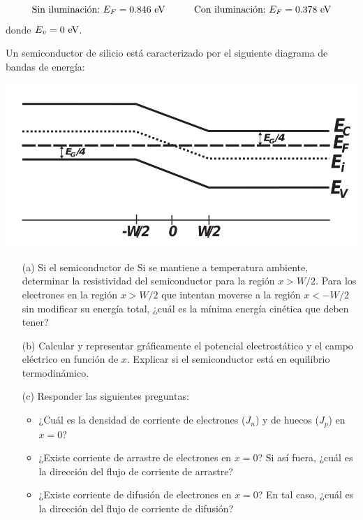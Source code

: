 \begin{texercise}
\begin{enumerate}[label=\alph*)]
		\begin{equation}
			\text{Sin iluminación:} \ E_F = 0.846 \ \eV \tquad 
			\text{Con iluminación:} \ E_F = 0.378 \ \eV
		\end{equation}
		donde $E_v=0 \ \text{eV}$. 
	\end{enumerate}
\end{texercise}



\begin{texercise}
	Un semiconductor de silicio está caracterizado por el siguiente diagrama de bandas de energía:
	\begin{center}
		\includegraphics[width=0.7\linewidth]{Cuerpo/Ch_02/02_Ejercicio_15.png}		
	\end{center}

	\begin{itemize}
		\item[(a)] Si el semiconductor de Si se mantiene a temperatura ambiente, determinar la resistividad del semiconductor para la región \(x > W/2\). Para los electrones en la región \(x > W/2\) que intentan moverse a la región \(x < -W/2\) sin modificar su energía total, ¿cuál es la mínima energía cinética que deben tener?
		\item[(b)] Calcular y representar gráficamente el potencial electrostático y el campo eléctrico en función de \(x\). Explicar si el semiconductor está en equilibrio termodinámico.
		\item[(c)] Responder las siguientes preguntas:
		      \begin{itemize}
			      \item ¿Cuál es la densidad de corriente de electrones (\(J_n\)) y de huecos (\(J_p\)) en \(x = 0\)?
			      \item ¿Existe corriente de arrastre de electrones en \(x = 0\)? Si así fuera, ¿cuál es la dirección del flujo de corriente de arrastre?
			      \item ¿Existe corriente de difusión de electrones en \(x = 0\)? En tal caso, ¿cuál es la dirección del flujo de corriente de difusión?
				\end{itemize}
	  \end{itemize}
	  \tcblower
	  

\end{texercise}
